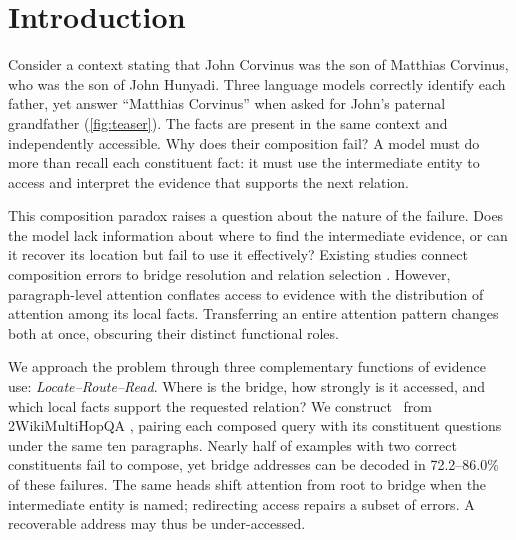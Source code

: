 \section{Introduction}\label{sec:intro}
Consider a context stating that John Corvinus was the son of Matthias Corvinus, who was the son of John Hunyadi. Three language models correctly identify each father, yet answer ``Matthias Corvinus'' when asked for John's paternal grandfather (\cref{fig:teaser}). The facts are present in the same context and independently accessible. Why does their composition fail? A model must do more than recall each constituent fact: it must use the intermediate entity to access and interpret the evidence that supports the next relation.

This composition paradox raises a question about the nature of the failure. Does the model lack information about where to find the intermediate evidence, or can it recover its location but fail to use it effectively? Existing studies connect composition errors to bridge resolution and relation selection \citep{press2023compositionality,biran2024hopping,wu2025retrieval,yu2025back}. However, paragraph-level attention conflates access to evidence with the distribution of attention among its local facts. Transferring an entire attention pattern changes both at once, obscuring their distinct functional roles.

We approach the problem through three complementary functions of evidence use: \emph{Locate--Route--Read}. Where is the bridge, how strongly is it accessed, and which local facts support the requested relation? We construct \dataset\ from 2WikiMultiHopQA \citep{ho2020constructing}, pairing each composed query with its constituent questions under the same ten paragraphs. Nearly half of examples with two correct constituents fail to compose, yet bridge addresses can be decoded in 72.2--86.0\% of these failures. The same heads shift attention from root to bridge when the intermediate entity is named; redirecting access repairs a subset of errors. A recoverable address may thus be under-accessed.


